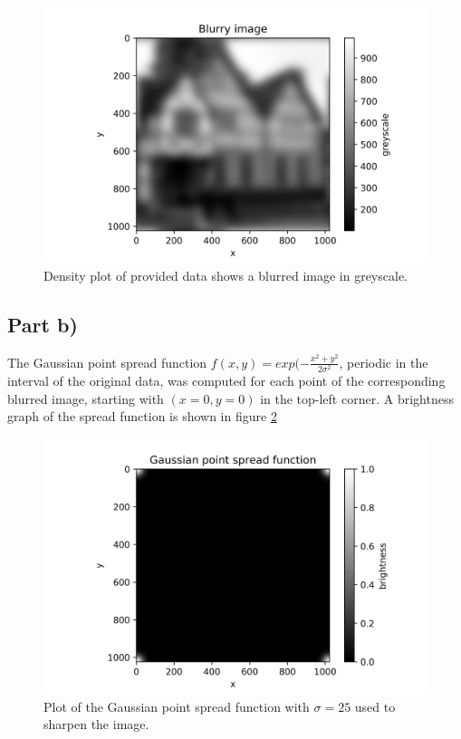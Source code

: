 \documentclass{article}
\begin{document}
\begin{figure}[H]
	\centering
	\includegraphics{../images/blurred_image.png}
	\caption{Density plot of provided data shows a blurred image in greyscale.}
	\label{fig:blurred_image}	
\end{figure}

\subsection{Part b)}
The Gaussian point spread function $f(x,y) = exp(-\frac{x^2+y^2}{2\sigma^2}$, periodic in the interval of the original data, was computed for each point of the corresponding blurred image, starting with $(x=0,y=0)$ in the top-left corner. A brightness graph of the spread function is shown in figure \ref{fig:spread_func}

\begin{figure}[H]
	\centering
	\includegraphics{../images/spread_function.png}
	\caption{Plot of the Gaussian point spread function with $\sigma=25$ used to sharpen the image.}
	\label{fig:spread_func}	
\end{figure}
\end{document}
